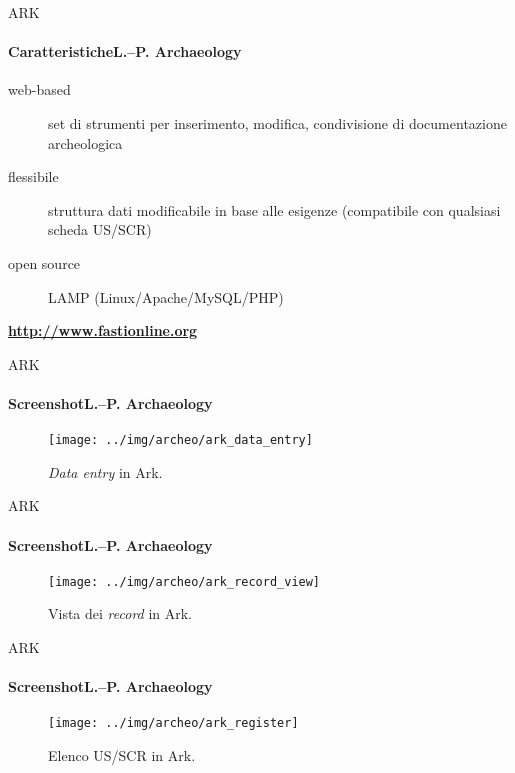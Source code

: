 \documentclass[xcolor=svgnames]{beamer}
\begin{document}

		\begin{frame}{ARK}
			\framesubtitle{Caratteristiche\hfill\small{\textbf{L.--P. Archaeology}}}
			\begin{description}
				\item[web-based] set di strumenti per inserimento, modifica, condivisione di documentazione archeologica
				\item[flessibile]struttura dati modificabile in base alle esigenze (compatibile con qualsiasi scheda US/SCR)
				\item[open source] LAMP (Linux/Apache/MySQL/PHP)
			\end{description}
			\vfill
			\begin{center}
				\textbf{\url{http://www.fastionline.org}}
			\end{center}
		\end{frame}


		\begin{frame}{ARK}
		\framesubtitle{Screenshot\hfill\small{\textbf{L.--P. Archaeology}}}
			\begin{figure}
				\centering
				\caption[\emph{Data entry} in Ark.]{\emph{Data entry} in Ark.}
				\texttt{[image: ../img/archeo/ark\_data\_entry]}
				\label{fig:data_entry}
			\end{figure}
		\end{frame}


		\begin{frame}{ARK}
		\framesubtitle{Screenshot\hfill\small{\textbf{L.--P. Archaeology}}}
			\begin{figure}
				\centering
				\caption[Vista dei \emph{record} in Ark.]{Vista dei \emph{record} in Ark.}
				\texttt{[image: ../img/archeo/ark\_record\_view]}
				\label{fig:data_entry}
			\end{figure}
		\end{frame}


		\begin{frame}{ARK}
		\framesubtitle{Screenshot\hfill\small{\textbf{L.--P. Archaeology}}}
			\begin{figure}
				\centering
				\caption[Elenco US/SCR in Ark.]{Elenco US/SCR in Ark.}
				\texttt{[image: ../img/archeo/ark\_register]}
				\label{fig:data_entry}
			\end{figure}
		\end{frame}
\end{document}
